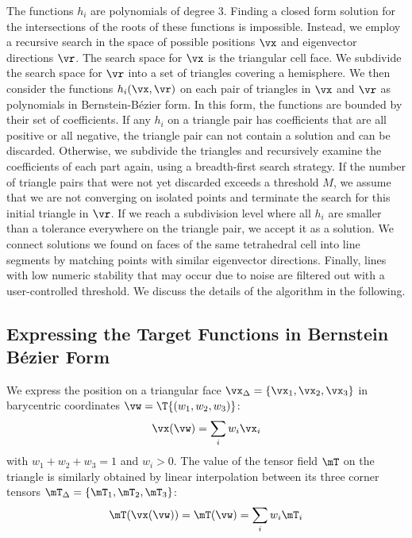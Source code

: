 %
The functions $h_i$ are polynomials of degree 3.
% 
Finding a closed form solution for the intersections of the roots of these
functions is impossible. 
% 
Instead, we employ a recursive search in the space of possible positions $\vx$
and eigenvector directions $\vr$.
% 
The search space for $\vx$ is the triangular cell face.
%
We subdivide the search space for $\vr$ into a set of triangles covering a
hemisphere.
% 
We then consider the functions $h_i(\vx, \vr)$ on each pair of triangles in
$\vx$ and $\vr$ as polynomials in Bernstein-B\'ezier form.
%
In this form, the functions are bounded by their set of coefficients.
%
If any $h_i$ on a triangle pair has coefficients that are all positive or all
negative, the triangle pair can not contain a solution and can be discarded.
%
Otherwise, we subdivide the triangles and recursively examine the coefficients
of each part again, using a breadth-first search strategy.
%
If the number of triangle pairs that were not yet discarded exceeds a threshold
$M$, we assume that we are not converging on isolated points and terminate the
search for this initial triangle in $\vr$.
% 
If we reach a subdivision level where all $h_i$ are smaller than a tolerance
everywhere on the triangle pair, we accept it as a solution.
%
We connect solutions we found on faces of the same tetrahedral cell into line
segments by matching points with similar eigenvector directions.
%
Finally, lines with low numeric stability that may occur due to noise are
filtered out with a user-controlled threshold.
%
We discuss the details of the algorithm in the following.
%

\subsection{Expressing the Target Functions in Bernstein B\'ezier Form} %
\label{sub:expressing_the_target_functions}
%
We express the position on a triangular face $\vx_\Delta = \{\vx_1, \vx_2,
\vx_3\}$ in barycentric coordinates $\vw = \T{(w_1, w_2, w_3)}$:
%
\begin{equation}
  \vx(\vw) = \sum_i w_i \vx_i
\end{equation}
%
with $w_1+w_2+w_3=1$ and $w_i > 0$.
%
The value of the tensor field $\mT$ on the triangle is similarly obtained
by linear interpolation between its three corner tensors $\mT_\Delta =
\{\mT_1, \mT_2, \mT_3\}$:
%
\begin{equation}
  \mT(\vx(\vw)) = \mT(\vw) = \sum_i w_i \mT_i
\end{equation}
%

